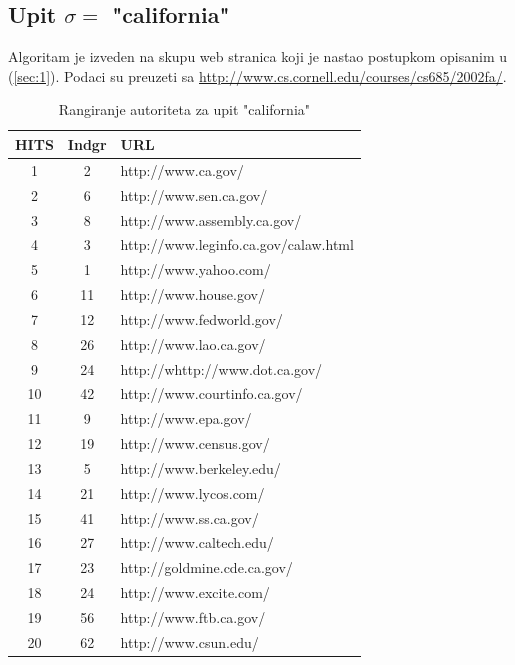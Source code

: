 \documentclass[11pt]{article}
\begin{document}
\subsection{Upit $\sigma =$ "california"}
Algoritam je izveden na skupu web stranica koji je nastao postupkom opisanim u (\ref{sec:1}). Podaci su preuzeti sa \url{http://www.cs.cornell.edu/courses/cs685/2002fa/}.
\begin{table} [h!]
\begin{tabular}{c|c|l}
HITS&Indgr&URL\\
\hline
1 & 2 & http://www.ca.gov/ \\
2 & 6 & http://www.sen.ca.gov/ \\
3 & 8 & http://www.assembly.ca.gov/\\
4 & 3 & http://www.leginfo.ca.gov/calaw.html\\
5 & 1 & http://www.yahoo.com/\\
6 & 11 & http://www.house.gov/\\
7 & 12 & http://www.fedworld.gov/\\
8 & 26 & http://www.lao.ca.gov/\\
9 & 24 & http://whttp://www.dot.ca.gov/\\
10 & 42 & http://www.courtinfo.ca.gov/\\
11 & 9 & http://www.epa.gov/\\
12 & 19 & http://www.census.gov/\\
13 & 5 & http://www.berkeley.edu/\\
14 & 21 & http://www.lycos.com/\\
15 & 41 & http://www.ss.ca.gov/\\
16 & 27 & http://www.caltech.edu/\\
17 & 23 & http://goldmine.cde.ca.gov/\\
18 & 24 & http://www.excite.com/\\
19 & 56 & http://www.ftb.ca.gov/\\
20 & 62 & http://www.csun.edu/
\end{tabular}
\caption{Rangiranje autoriteta za upit "california"}
\end{table}
\end{document}

